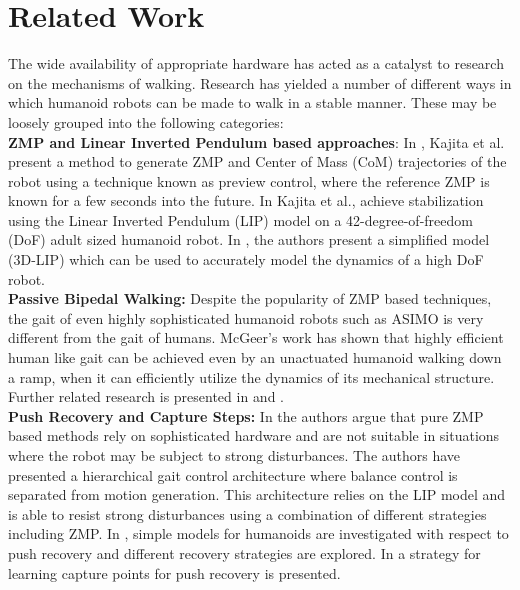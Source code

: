 \documentclass[12pt,twoside]{article}
\theoremstyle{plain}
\theoremstyle{definition}
\theoremstyle{remark}
\begin{document}
\section{Related Work}
\label{sec:Related_Work}
The wide availability of appropriate hardware has acted as a catalyst to research on the mechanisms of walking. Research has yielded a number of different ways in which humanoid robots can be made to walk in a stable manner. These may be loosely grouped into the following categories:\\
\textbf{ZMP and Linear Inverted Pendulum based approaches}: In \cite{kajita2003biped}, Kajita et al. present a method to generate ZMP and Center of Mass (CoM) trajectories of the robot using a technique known as preview control, where the reference ZMP is known for a few seconds into the future. In \cite{kajita2010biped} Kajita et al., achieve stabilization using the Linear Inverted Pendulum (LIP) model on a 42-degree-of-freedom (DoF) adult sized humanoid robot. In \cite{kajita20013d}, the authors present a simplified model (3D-LIP) which can be used to accurately model the dynamics of a high DoF robot.\\
\textbf{Passive Bipedal Walking:} Despite the popularity of ZMP based techniques, the gait of even highly sophisticated humanoid robots such as ASIMO is very different from the gait of humans. McGeer's work \cite{mcgeer1990passive} has shown that highly efficient human like gait can be achieved even by an unactuated humanoid walking down a ramp, when it can efficiently utilize the dynamics of its mechanical structure. Further related research is presented in \cite{kuo1999stabilization} and \cite{collins2005efficient}.\\
\textbf{Push Recovery and Capture Steps: } In \cite{missura2013omnidirectional, missura2014online, missura2015gradient} the authors argue that pure ZMP based methods rely on sophisticated hardware and are not suitable in situations where the robot may be subject to strong disturbances. The authors have presented a hierarchical gait control architecture where balance control is separated from motion generation. This architecture relies on the LIP model and is able to resist strong disturbances using a combination of different strategies including ZMP. In \cite{stephens2007humanoid}, simple models for humanoids are investigated with respect to push recovery and different recovery strategies are explored. In \cite{rebula2007learning} a strategy for learning capture points for push recovery is presented.\\
\end{document}
